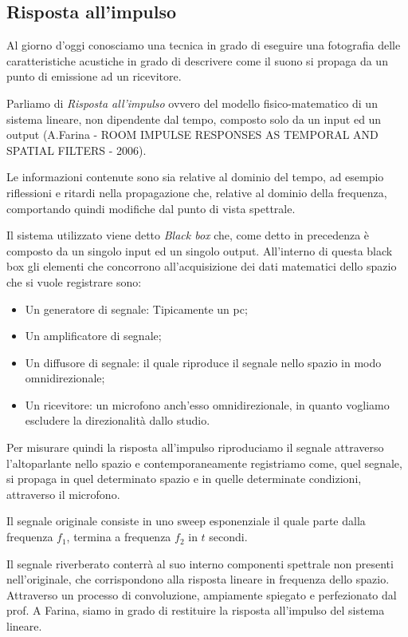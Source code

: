 \subsection{Risposta all'impulso}
Al giorno d’oggi conosciamo una tecnica in grado di eseguire una fotografia delle caratteristiche acustiche in grado di descrivere come il suono si propaga da un punto di emissione ad un ricevitore. 

Parliamo di \textit{Risposta all’impulso} ovvero del modello fisico-matematico di un sistema lineare, non dipendente dal tempo, composto solo da un input ed un output (A.Farina - ROOM IMPULSE RESPONSES AS TEMPORAL AND SPATIAL FILTERS - 2006).

Le informazioni contenute sono sia relative al dominio del tempo, ad esempio riflessioni e ritardi nella propagazione che, relative al dominio della frequenza, comportando quindi modifiche dal punto di vista spettrale.

Il sistema utilizzato viene detto \textit{Black box} che, come detto in precedenza è composto da un singolo input ed un singolo output. All’interno di questa black box gli elementi che concorrono all’acquisizione dei dati matematici dello spazio che si vuole registrare sono:
\begin{itemize}
\item Un generatore di segnale: Tipicamente un pc;
\item Un amplificatore di segnale;
\item Un diffusore di segnale: il quale riproduce il segnale nello spazio in modo omnidirezionale;
\item Un ricevitore: un microfono anch’esso omnidirezionale, in quanto vogliamo escludere la direzionalità dallo studio.
\end{itemize}
Per misurare quindi la risposta all'impulso riproduciamo il segnale attraverso l’altoparlante nello spazio e contemporaneamente registriamo come, quel segnale, si propaga in quel determinato spazio e in quelle determinate condizioni, attraverso il microfono.

Il segnale originale consiste in uno sweep esponenziale il quale parte dalla frequenza $f_1$, termina a frequenza $f_2$ in $t$ secondi.

Il segnale riverberato conterrà al suo interno componenti spettrale non presenti nell’originale, che corrispondono alla risposta lineare in frequenza dello spazio.
Attraverso un processo di convoluzione, ampiamente spiegato e perfezionato dal prof. A Farina, siamo in grado di restituire la risposta all'impulso del sistema lineare.

